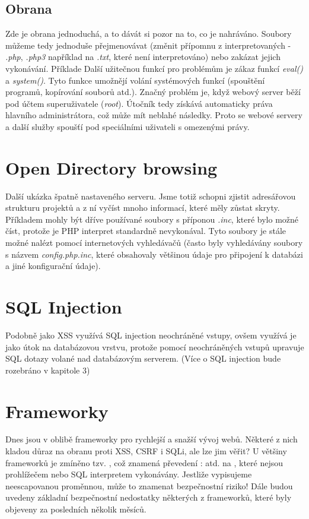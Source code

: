 \documentclass[12pt, a4paper]{report}
\begin{document}
\subsection{Obrana}
Zde je obrana jednoduchá, a to dávát si pozor na to, co je nahráváno. Soubory můžeme tedy jednoduše přejmenovávat (změnit přípomnu z interpretovaných - \textit{.php}, \textit{.php3}  například na \textit{.txt}, které není interpretováno) nebo zakázat jejich vykonávání. Příklade Další užitečnou funkcí pro  problémům je zákaz funkcí \textit{eval()} a \textit{system()}. Tyto funkce umožnějí volání systémových funkcí (spouštění programů, kopírování souborů atd.). Značný problém je, když webový server běží pod účtem superuživatele (\textit{root}). Útočník tedy získává automaticky práva hlavního administrátora, což může mít neblahé následky. Proto se webové servery a další služby spoušťí pod speciálními uživateli s omezenými právy.

\section{Open Directory browsing}
Další ukázka špatně nastaveného serveru. Jsme totiž schopni zjistit adresářovou strukturu projektů a z ní vyčíst mnoho informací, které měly zůstat skryty. Příkladem mohly být dříve používané soubory s příponou \textit{.inc}, které bylo možné číst, protože je PHP interpret standardně nevykonával. Tyto soubory je stále možné nalézt pomocí internetových vyhledávačů (často byly vyhledávány soubory s názvem \textit{config.php.inc}, které obsahovaly většinou údaje pro připojení k databázi a jiné konfigurační údaje).

\section{SQL Injection}
Podobně jako XSS využívá SQL injection neochráněné vstupy, ovšem využívá je jako útok na databázovou vrstvu, protože pomocí neochráněných vstupů upravuje SQL dotazy volané nad databázovým serverem. (Více o SQL injection bude rozebráno v kapitole 3)

\section{Frameworky}
Dnes jsou v oblibě frameworky pro rychlejší a snažší vývoj webů. Některé z nich kladou důraz na obranu proti XSS, CSRF i SQLi, ale lze jim věřit? U většiny frameworků je zmíněno tzv. , což znamená převedení : \uv{<>\"} atd. na , které nejsou prohlížečem nebo SQL interpretem vykonávány. Jestliže vypisujeme neescapovanou proměnnou, může to znamenat bezpečnostní riziko! Dále budou uvedeny základní bezpečnostní nedostatky některých z frameworků, které byly objeveny za posledních několik měsíců.
\end{document}
